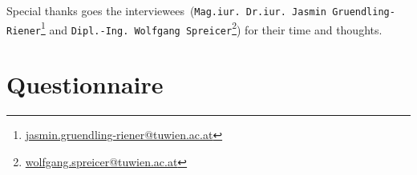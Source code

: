 \documentclass{article}
\begin{document}
Special thanks goes the interviewees~(\texttt{Mag.iur. Dr.iur. Jasmin Gruendling-Riener}\footnote{\href{mailto:jasmin.gruendling-riener@tuwien.ac.at}{jasmin.gruendling-riener@tuwien.ac.at}} and \texttt{Dipl.-Ing. Wolfgang Spreicer}\footnote{\href{mailto:wolfgang.spreicer@tuwien.ac.at}{wolfgang.spreicer@tuwien.ac.at}}) for their time and thoughts.
\newpage


\printbibliography[title={References to refereed scientific work}, keyword=refsw]

\printbibliography[title={References to non-refereed work}, keyword=nonrefw]

\printbibliography[title={References to websites}, type=misc]

\newpage
\appendix

\section{Questionnaire}

\end{document}
